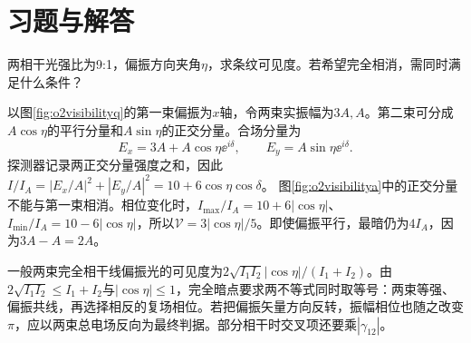 



\section{习题与解答}


\begin{exercise}\label{ex:o2visibility}
两相干光强比为9:1，偏振方向夹角$\eta$，求条纹可见度。若希望完全相消，需同时满足什么条件？
\end{exercise}
\begin{solution}
以图\ref{fig:o2visibilityq}的第一束偏振为$x$轴，令两束实振幅为$3A,A$。第二束可分成$A\cos\eta$的平行分量和$A\sin\eta$的正交分量。合场分量为
\[
 E_x=3A+A\cos\eta\ee^{i\delta},\qquad
 E_y=A\sin\eta\ee^{i\delta}.
\]
探测器记录两正交分量强度之和，因此$I/I_A=|E_x/A|^2+|E_y/A|^2=10+6\cos\eta\cos\delta$。
图\ref{fig:o2visibilitya}中的正交分量不能与第一束相消。相位变化时，$I_{\max}/I_A=10+6|\cos\eta|$、$I_{\min}/I_A=10-6|\cos\eta|$，所以$\mathcal V=3|\cos\eta|/5$。即使偏振平行，最暗仍为$4I_A$，因为$3A-A=2A$。

一般两束完全相干线偏振光的可见度为$2\sqrt{I_1I_2}|\cos\eta|/(I_1+I_2)$。由$2\sqrt{I_1I_2}\leq I_1+I_2$与$|\cos\eta|\leq1$，完全暗点要求两不等式同时取等号：两束等强、偏振共线，再选择相反的复场相位。若把偏振矢量方向反转，振幅相位也随之改变$\pi$，应以两束总电场反向为最终判据。部分相干时交叉项还要乘$|\gamma_{12}|$。
\end{solution}

